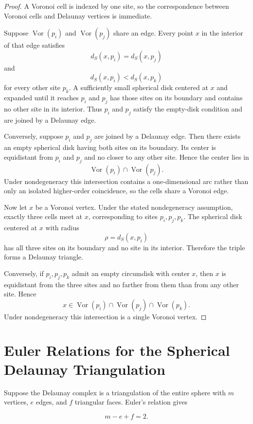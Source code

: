 \documentclass[11pt,fleqn]{book}
\numberwithin{equation}{chapter}
\theoremstyle{plain}
\theoremstyle{definition}
\theoremstyle{remark}
\newcommand{\Vor}{\operatorname{Vor}}
\begin{document}
\begin{proof}
A Voronoi cell is indexed by one site, so the correspondence between Voronoi cells and Delaunay vertices is immediate.

Suppose \(\Vor(p_i)\) and \(\Vor(p_j)\) share an edge. Every point \(x\) in the interior of that edge satisfies
\[
d_S(x,p_i)=d_S(x,p_j)
\]
and
\[
d_S(x,p_i)<d_S(x,p_k)
\]
for every other site \(p_k\). A sufficiently small spherical disk centered at \(x\) and expanded until it reaches \(p_i\) and \(p_j\) has those sites on its boundary and contains no other site in its interior. Thus \(p_i\) and \(p_j\) satisfy the empty-disk condition and are joined by a Delaunay edge.

Conversely, suppose \(p_i\) and \(p_j\) are joined by a Delaunay edge. Then there exists an empty spherical disk having both sites on its boundary. Its center is equidistant from \(p_i\) and \(p_j\) and no closer to any other site. Hence the center lies in
\[
\Vor(p_i)\cap\Vor(p_j).
\]
Under nondegeneracy this intersection contains a one-dimensional arc rather than only an isolated higher-order coincidence, so the cells share a Voronoi edge.

Now let \(x\) be a Voronoi vertex. Under the stated nondegeneracy assumption, exactly three cells meet at \(x\), corresponding to sites \(p_i,p_j,p_k\). The spherical disk centered at \(x\) with radius
\[
\rho=d_S(x,p_i)
\]
has all three sites on its boundary and no site in its interior. Therefore the triple forms a Delaunay triangle.

Conversely, if \(p_i,p_j,p_k\) admit an empty circumdisk with center \(x\), then \(x\) is equidistant from the three sites and no farther from them than from any other site. Hence
\[
x\in
\Vor(p_i)\cap
\Vor(p_j)\cap
\Vor(p_k).
\]
Under nondegeneracy this intersection is a single Voronoi vertex.
\end{proof}

\section{Euler Relations for the Spherical Delaunay Triangulation}

Suppose the Delaunay complex is a triangulation of the entire sphere with \(m\) vertices, \(e\) edges, and \(f\) triangular faces. Euler's relation gives

\begin{equation}
    m-e+f=2.
\end{equation}
\end{document}
